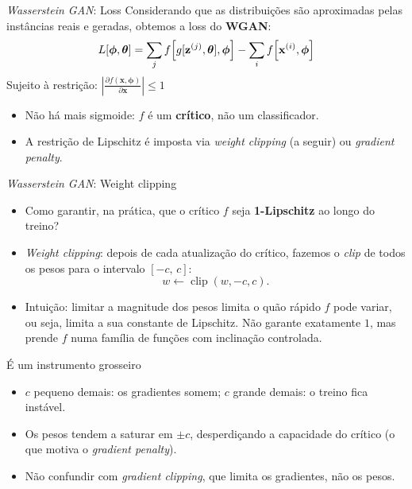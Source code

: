 \documentclass[aspectratio=169,xcolor=dvipsnames]{beamer}
\begin{document}
  \begin{frame}{\textit{Wasserstein GAN}: Loss}
    Considerando que as distribuições são aproximadas pelas instâncias
    reais e geradas, obtemos a loss do \textbf{WGAN}:
    \vspace{0.3em}
    \[
      L[\bm{\phi},\bm{\theta}] = \sum_{j} f\!\left[g[\mathbf{z}^{(j)},\bm{\theta}],\bm{\phi}\right]
      - \sum_{i} f\!\left[\mathbf{x}^{(i)},\bm{\phi}\right]
    \]
    \vspace{0.3em}
    Sujeito à restrição: $\left|\frac{\partial f(\mathbf{x},\bm{\phi})}{\partial \mathbf{x}}\right| \le 1$
    \vspace{0.3em}
    \begin{itemize}
      \item Não há mais sigmoide: $f$ é um \textbf{crítico}, não um
      classificador.
      \item A restrição de Lipschitz é imposta via \emph{weight clipping}
      (a seguir) ou \emph{gradient penalty}\cite{gulrajani2017improved}.
    \end{itemize}
  \end{frame}

  \begin{frame}{\textit{Wasserstein GAN}: Weight clipping}
    \begin{itemize}
      \item Como garantir, na prática, que o crítico $f$ seja
      \textbf{1-Lipschitz} ao longo do treino?
      \item \emph{Weight clipping}: depois de cada atualização do
      crítico, fazemos o \emph{clip} de todos os pesos para o intervalo
      $[-c,\,c]$:
      \[
        w \leftarrow \operatorname{clip}(w, -c, c).
      \]
      \item Intuição: limitar a magnitude dos pesos limita o quão rápido
      $f$ pode variar, ou seja, limita a sua constante de Lipschitz. Não
      garante exatamente $1$, mas prende $f$ numa família de funções com
      inclinação controlada.
    \end{itemize}
    \begin{alertblock}{É um instrumento grosseiro}
      \begin{itemize}
        \item $c$ pequeno demais: os gradientes somem; $c$ grande demais:
        o treino fica instável.
        \item Os pesos tendem a saturar em $\pm c$, desperdiçando a
        capacidade do crítico (o que motiva o \emph{gradient penalty}).
        \item Não confundir com \emph{gradient clipping}, que limita os
        gradientes, não os pesos.
      \end{itemize}
    \end{alertblock}
  \end{frame}
\end{document}
